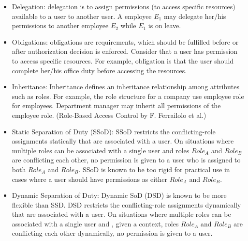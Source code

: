 \begin{itemize}


	\item Delegation: delegation is to assign permissions (to access specific resources) available to a user to another user.
	A employee $E_1$ may delegate her/his permissions to another employee $E_2$ while $E_1$ is on leave. 
	
	
	\item Obligations: obligations are requirements, which should be fulfilled before or after authorization decision is enforced.
	Consider that a user has permission to access specific resources. For example, obligation is that the user should complete
	her/his office duty before accessing the resources.
	
	\item Inheritance:
	Inheritance defines an inheritance relationship among attributes such as roles. For example, the role structure for a company use
	employee role for employees. Department manager may inherit all permissions of the employee role. (Role-Based Access Control by F. Ferrailolo et al.)
	
	\item Static Separation of Duty (SSoD): SSoD restricts the conflicting-role assignments statically that are associated with a user. On situations
	where multiple roles can be associated with a single user and roles $Role_A$ and $Role_B$ are conflicting each other, no permission is given to a user who is assigned to both $Role_A$ and $Role_B$. SSoD is known to be too rigid for practical use in cases where a user should have permissions as either $Role_A$ and $Role_B$.

	\item Dynamic Separation of Duty: Dynamic SoD (DSD) is known to be
more flexible than SSD. DSD restricts the conflicting-role assignments dynamically that are associated with a user. On situations
	where multiple roles can be associated with a single user and , given a context, roles $Role_A$ and $Role_B$ are conflicting each other dynamically, no permission is given to a user.
	\end{itemize} 

